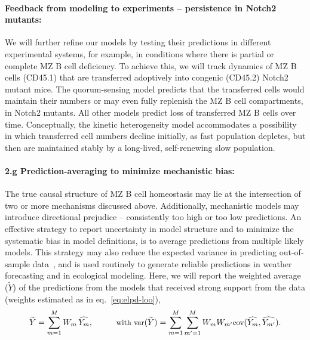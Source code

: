 \documentclass[11pt]{article}
\newcommand{\para}[1]{\vspace*{-4.5mm}\paragraph{#1}}
\begin{document}


\para{{Feedback from modeling to experiments -- persistence in Notch2 mutants:}}
We will further refine our models by testing their predictions in different experimental systems, for example, in conditions where there is partial or complete MZ B cell deficiency.
To achieve this, we will track dynamics of MZ B cells (CD45.1) that are transferred adoptively into congenic (CD45.2)  Notch2 mutant mice. %
The quorum-sensing model predicts that the transferred cells would maintain their numbers or may even fully replenish the MZ B cell compartments, in Notch2 mutants.
All other models predict loss of transferred MZ B cells over time.
Conceptually, the kinetic heterogeneity model accommodates a possibility in which transferred cell numbers decline initially, as fast population depletes, but then are maintained stably by a long-lived, self-renewing slow population.


\para{2.g Prediction-averaging to minimize  mechanistic bias:}
The true causal structure of MZ B cell homeostasis may lie at the intersection of two or more mechanisms discussed above.
Additionally, mechanistic models may introduce directional prejudice -- consistently too high or too low predictions. 
An effective strategy to report uncertainty in model structure and to minimize the systematic bias in model definitions, is to average predictions from multiple likely models. 
This strategy may also reduce the expected variance in predicting out-of-sample data~\cite{Wintle:2003, Dormann:2018}, and is used routinely to generate reliable predictions  in weather forecasting and in ecological modeling.
Here, we will report the weighted average ($\widetilde{Y}$) of the predictions from the models that received strong support from the data (weights estimated as in eq.~\ref{eq:elpd-loo}),
\vspace{-1mm}
\begin{equation} \small
\widetilde{Y} = \sum_{m=1}^{M} W_{m} \, \widehat{Y_{m}}, \quad \quad  \quad
\text{with } \text{var}(\widetilde{Y}) =  \sum_{m=1}^{M} \sum_{m'=1}^{M} W_{m} W_{m'} \text{cov}(\widehat{Y_{m}}, \widehat{Y_{m'}}).
\label{eq:model-averaging}
\vspace{-2mm}
\end{equation}
\end{document}
